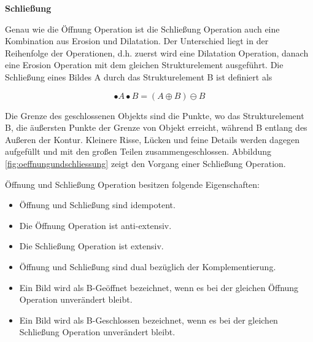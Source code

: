 \newpage
\textbf{Schließung}

Genau wie die Öffnung Operation ist die Schließung Operation auch eine Kombination aus Erosion und Dilatation. Der Unterschied liegt in der Reihenfolge der Operationen, d.h. zuerst wird eine Dilatation Operation, danach eine Erosion Operation mit dem gleichen Strukturelement ausgeführt. Die Schließung eines Bildes A durch das Strukturelement B ist definiert als

\begin{equation}
•A \bullet B =( A \oplus B )\ominus B  
\end{equation}

Die Grenze des geschlossenen Objekts sind die Punkte, wo das Strukturelement B, die äußersten Punkte der Grenze von Objekt erreicht, während B entlang des Außeren der Kontur. Kleinere Risse, Lücken und feine Details werden dagegen aufgefüllt und mit den großen Teilen zusammengeschlossen. Abbildung \ref{fig:oeffnungundschliessung} zeigt den Vorgang einer Schließung Operation.


Öffnung und Schließung Operation besitzen folgende Eigenschaften:

\begin{itemize}

\item Öffnung und Schließung sind idempotent.
\item Die Öffnung Operation ist anti-extensiv. 
\item Die Schließung Operation ist extensiv.
\item Öffnung und Schließung sind dual bezüglich der Komplementierung.
\item Ein Bild wird als B-Geöffnet bezeichnet, wenn es bei der gleichen Öffnung Operation unverändert bleibt. 
\item Ein Bild wird als B-Geschlossen bezeichnet, wenn es bei der gleichen Schließung Operation unverändert bleibt. 

\end{itemize}



